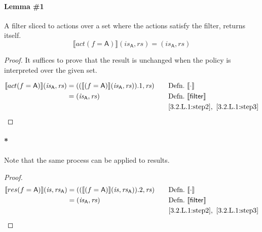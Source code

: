 \documentclass[12pt, letterpaper]{article}
\newcommand\interp[1]{\llbracket #1 \rrbracket}
\begin{document}
 \paragraph{Lemma \#1}
     A filter sliced to actions over a set where the actions satisfy the filter, returns itself.
 \[
     \interp{ act(f=\mathsf{A}) } (\mathit{is}_{\mathsf{A}}, \mathit{rs}) = (\mathit{is_{\mathsf{A}}}, \mathit{rs})
 \]
 \begin{proof}
     It suffices to prove that the result is unchanged when the policy is interpreted over the given set.
     \par\nobreak
     {\fontsize{10pt}{12pt}\selectfont
     \begin{alignat}{2}
         \setcounter{equation}{0}
         \label{3.2.L.1:step2}
         \interp{ act(f=\mathsf{A}) } (\mathit{is}_{\mathsf{A}}, \mathit{rs})
         &= 
         ((\interp{ (f=\mathsf{A}) } (\mathit{is}_{\mathsf{A}}, \mathit{rs})).1, \mathit{rs})
         &&\quad \text{Defn.}\ \interp{\cdot}\\
         \label{3.2.L.1:step3}
         &=
         (\mathit{is}_{\mathsf{A}}, \mathit{rs})
         &&\quad \text{Defn.}\ \interp{\mathsf{filter}}\\
         \label{3.2.L.1:qed}
         &\qedhere
         &&\quad \ref{3.2.L.1:step2},\ \ref{3.2.L.1:step3}
     \end{alignat}
     }%
    \end{proof}
     \paragraph{*} Note that the same process can be applied to results.
    \begin{proof}
     {\fontsize{10pt}{12pt}\selectfont
     \begin{alignat}{2}
         \setcounter{equation}{0}
         \label{3.2.L.1*:step2}
         \interp{ res(f=\mathsf{A}) } (\mathit{is}, \mathit{rs}_{\mathsf{A}})
         &= 
         ((\interp{ (f=\mathsf{A}) } (\mathit{is}, \mathit{rs}_{\mathsf{A}})).2, \mathit{rs})
         &&\quad \text{Defn.}\ \interp{\cdot}\\
         \label{3.2.L.1*:step3}
         &=
         (\mathit{is}_{\mathsf{A}}, \mathit{rs})
         &&\quad \text{Defn.}\ \interp{\mathsf{filter}}\\
         \label{3.2.L.1*:qed}
         &\qedhere
         &&\quad \ref{3.2.L.1:step2},\ \ref{3.2.L.1:step3}
     \end{alignat}
     }
 \end{proof}
\end{document}
